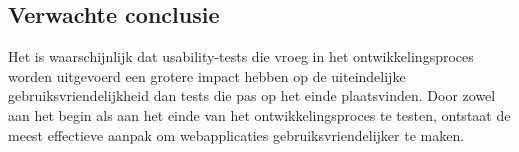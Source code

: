 \subsection{Verwachte conclusie}
Het is waarschijnlijk dat usability-tests die vroeg in het ontwikkelingsproces worden uitgevoerd een grotere impact hebben op de uiteindelijke gebruiksvriendelijkheid dan tests die pas op het einde plaatsvinden. 
Door zowel aan het begin als aan het einde van het ontwikkelingsproces te testen, ontstaat de meest effectieve aanpak om webapplicaties gebruiksvriendelijker te maken.